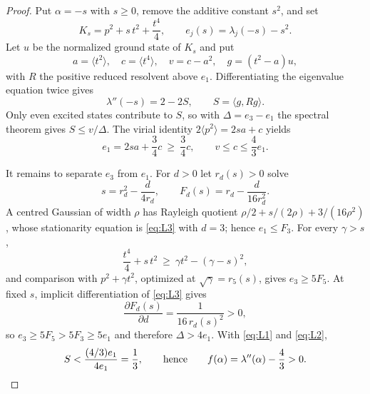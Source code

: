 \documentclass[11pt,reqno]{amsart}
\theoremstyle{plain}
\theoremstyle{definition}
\theoremstyle{remark}
\numberwithin{equation}{section}
\begin{document}
\begin{proof}
  Put $\alpha=-s$ with $s\ge0$, remove the additive constant $s^2$, and set
  \begin{equation*}
    K_s=p^2+s\,t^2+\frac{t^4}{4},
    \qquad
    e_j(s)=\lambda_j(-s)-s^2 .
  \end{equation*}
  Let $u$ be the normalized ground state of $K_s$ and put
  \begin{equation*}
    a=\langle t^2\rangle,\quad
    c=\langle t^4\rangle,\quad
    v=c-a^2,\quad
    g=(t^2-a)u,
  \end{equation*}
  with $R$ the positive reduced resolvent above $e_1$. Differentiating the
  eigenvalue equation twice gives
  \begin{equation}
    \label{eq:L1}
    \lambda''(-s)=2-2S,
    \qquad S=\langle g,Rg\rangle .
  \end{equation}
  Only even excited states contribute to $S$, so with $\Delta=e_3-e_1$ the
  spectral theorem gives $S\le v/\Delta$. The virial identity
  $2\langle p^2\rangle=2sa+c$ yields
  \begin{equation}
    \label{eq:L2}
    e_1=2sa+\frac34c\ \ge\ \frac34c,
    \qquad
    v\le c\le\frac43e_1 .
  \end{equation}

  It remains to separate $e_3$ from $e_1$. For $d>0$ let $r_d(s)>0$ solve
  \begin{equation}
    \label{eq:L3}
    s=r_d^2-\frac{d}{4r_d},
    \qquad
    F_d(s)=r_d-\frac{d}{16r_d^2}.
  \end{equation}
  A centred Gaussian of width $\rho$ has Rayleigh quotient
  $\rho/2+s/(2\rho)+3/(16\rho^2)$, whose stationarity equation is
  \eqref{eq:L3} with $d=3$; hence $e_1\le F_3$. For every $\gamma>s$,
  \begin{equation*}
    \frac{t^4}{4}+s\,t^2\ \ge\ \gamma t^2-(\gamma-s)^2 ,
  \end{equation*}
  and comparison with $p^2+\gamma t^2$, optimized at
  $\sqrt\gamma=r_5(s)$, gives $e_3\ge5F_5$. At fixed $s$, implicit
  differentiation of \eqref{eq:L3} gives
  \begin{equation}
    \label{eq:L4}
    \frac{\partial F_d(s)}{\partial d}=\frac1{16\,r_d(s)^2}>0 ,
  \end{equation}
  so $e_3\ge5F_5>5F_3\ge5e_1$ and therefore $\Delta>4e_1$. With
  \eqref{eq:L1} and \eqref{eq:L2},
  \begin{equation}
    \label{eq:S-third}
    S<\frac{(4/3)e_1}{4e_1}=\frac13,
    \qquad\text{hence}\qquad
    f(\alpha)=\lambda''(\alpha)-\frac43>0 . \qedhere
  \end{equation}
\end{proof}
\end{document}
